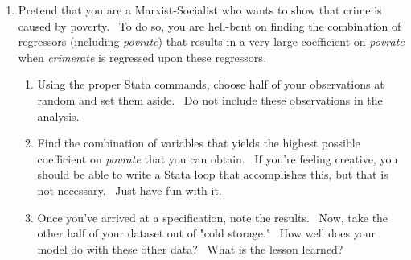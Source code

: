\documentclass[11pt]{article}
\begin{document}
\begin{enumerate}
\item Pretend that you are a Marxist-Socialist who wants to show that crime
is caused by poverty. \ To do so, you are hell-bent on finding the
combination of regressors (including \textit{povrate}) that results in a
very large coefficient on \textit{povrate} when \textit{crimerate }is
regressed upon these regressors\textit{.}

\begin{enumerate}
\item Using the proper Stata commands, choose half of your observations at
random and set them aside. \ Do not include these observations in the
analysis.

\item Find the combination of variables that yields the highest possible
coefficient on \textit{povrate }that you can obtain. \ If you're feeling
creative, you should be able to write a Stata loop that accomplishes this,
but that is not necessary. \ Just have fun with it.

\item Once you've arrived at a specification, note the results. \ Now, take
the other half of your dataset out of "cold storage." \ How well does your
model do with these other data? \ What is the lesson learned? \ 
\end{enumerate}
\end{enumerate}
\end{document}
